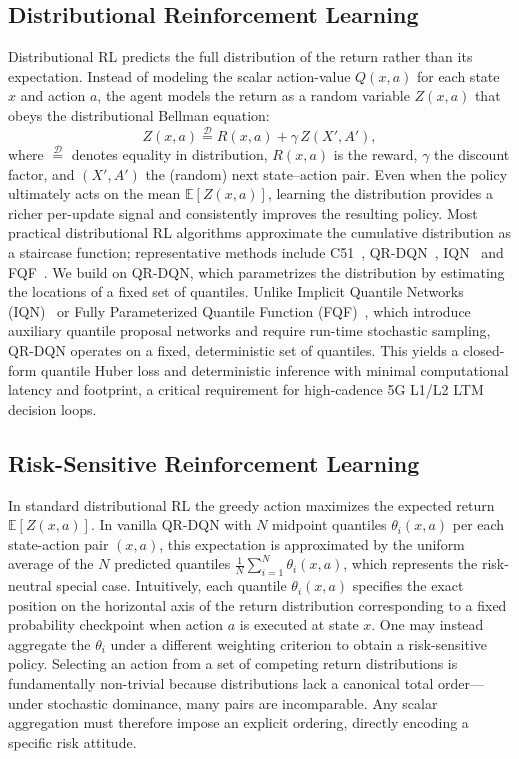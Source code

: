 \documentclass{ieeetmlcn}
\begin{document}
\subsection{Distributional Reinforcement Learning}
\label{sec:rel-distrl}
Distributional RL predicts the full distribution of the return rather than its expectation. Instead of modeling the scalar action-value $Q(x,a)$ for each state $x$ and action $a$, the agent models the return as a random variable $Z(x,a)$ that obeys the distributional Bellman equation:
\begin{equation}
Z(x,a) \overset{\mathcal{D}}{=} R(x,a) + \gamma\,Z(X',A'),
\label{eq:dist-bellman}
\end{equation}
where $\overset{\mathcal{D}}{=}$ denotes equality in distribution, $R(x,a)$ is the reward, $\gamma$ the discount factor, and $(X',A')$ the (random) next state--action pair.
Even when the policy ultimately acts on the mean $\mathbb{E}[Z(x,a)]$, learning the distribution provides a richer per-update signal and consistently improves the resulting policy.
Most practical distributional RL algorithms approximate the cumulative distribution as a staircase function; representative methods include C51~\cite{c51}, QR-DQN~\cite{qrdqn}, IQN~\cite{iqn} and FQF~\cite{fqf}.
We build on QR-DQN, which parametrizes the distribution by estimating the locations of a fixed set of quantiles. Unlike Implicit Quantile Networks (IQN)~\cite{iqn} or Fully Parameterized Quantile Function (FQF)~\cite{fqf}, which introduce auxiliary quantile proposal networks and require run-time stochastic sampling, QR-DQN operates on a fixed, deterministic set of quantiles. This yields a closed-form quantile Huber loss and deterministic inference with minimal computational latency and footprint, a critical requirement for high-cadence 5G L1/L2 LTM decision loops.


\subsection{Risk-Sensitive Reinforcement Learning}
\label{sec:rel-risk}
In standard distributional RL the greedy action maximizes the expected return $\mathbb{E}[Z(x,a)]$. In vanilla QR-DQN with $N$ midpoint quantiles $\theta_i(x, a)$ per each state-action pair $(x,a)$, this expectation is approximated by the uniform average of the $N$ predicted quantiles $\tfrac{1}{N}\sum_{i=1}^{N}\theta_i(x,a)$, which represents the risk-neutral special case.
Intuitively, each quantile $\theta_i(x, a)$ specifies the exact position on the horizontal axis of the return distribution corresponding to a fixed probability checkpoint when action $a$ is executed at state $x$. One may instead aggregate the $\theta_i$ under a different weighting criterion to obtain a risk-sensitive policy. Selecting an action from a set of competing return distributions is fundamentally non-trivial because distributions lack a canonical total order---under stochastic dominance, many pairs are incomparable. Any scalar aggregation must therefore impose an explicit ordering, directly encoding a specific risk attitude.
\end{document}

